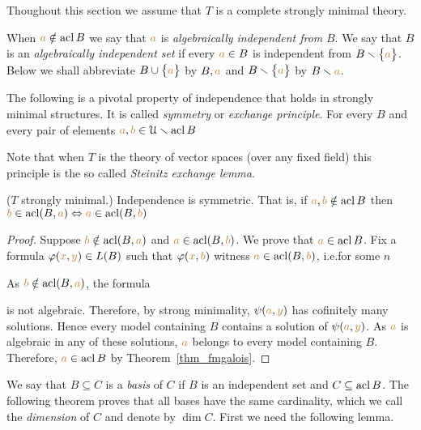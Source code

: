 Thoughout this section we assume that $T$ is a complete strongly minimal theory.
 

When ${\color{brown} a}\notin\mathop{\rm acl} B$ we say that ${\color{brown} a}$ is \emph{algebraically independent from\/} $B$.
We say that $B$ is an \emph{algebraically independent set\/} if every ${\color{brown} a}\in B$ is independent from $B\smallsetminus\big\{{\color{brown} a}\big\}$.
Below we shall abbreviate $B\cup\big\{{\color{brown} a}\big\}$ by \emph{$B,{\color{brown} a}$} and  $B\smallsetminus\big\{{\color{brown} a}\big\}$ by \emph{$B\smallsetminus{\color{brown}a}$}.


The following is a pivotal property of independence that holds in strongly minimal structures.
It is called \emph{symmetry\/} or \emph{exchange principle}.
For every $B$ and every pair of elements ${\color{brown} a},{\color{brown} b}\in\EuScript U\smallsetminus\mathop{\rm acl} B$


Note that when $T$ is the theory of vector spaces (over any fixed field) this principle is the so called \emph{Steinitz exchange lemma}.

\begin{theorem} 
($T$ strongly minimal.) Independence is symmetric.
That is, if ${\color{brown} a},{\color{brown} b}\notin\mathop{\rm acl} B$ then ${\color{brown} b}\in\mathop{\rm acl} (B,{\color{brown} a})\Leftrightarrow{\color{brown}a}\in\mathop{\rm acl}(B,{\color{brown} b})$
\end{theorem} 

\begin{proof} 
Suppose ${\color{brown} b}\notin\mathop{\rm acl}(B,{\color{brown} a})$ and ${\color{brown} a}\in\mathop{\rm acl}(B,{\color{brown} b})$.
We prove that ${\color{brown} a}\in\mathop{\rm acl} B$.
Fix a formula $\varphi({\color{brown} x},{\color{brown} y})\in L(B)$ such that $\varphi({\color{brown} x},{\color{brown} b})$ witness ${\color{brown} a}\in\mathop{\rm acl}(B,{\color{brown} b})$, i.e.\@ for some $n$


As ${\color{brown} b}\notin\mathop{\rm acl}(B,{\color{brown} a})$, the formula


is not algebraic.
Therefore, by strong minimality, $\psi({\color{brown} a},{\color{brown} y})$ has cofinitely many solutions.
Hence every model containing $B$ contains a solution of $\psi({\color{brown} a},{\color{brown} y})$.
As ${\color{brown} a}$ is algebraic in any of these solutions, ${\color{brown} a}$ belongs to every model containing $B$.
Therefore, ${\color{brown} a}\in\mathop{\rm acl} B$ by Theorem~\ref{thm_fmgalois}.
\end{proof}

We say that $B\subseteq C$ is a \emph{basis\/} of $C$ if $B$ is an independent set and $C\subseteq\mathop{\rm acl} B$.
The following theorem proves that all bases have the same cardinality, which we call the  \emph{dimension\/} of $C$ and denote by \emph{$\dim C$}.
First we need the following lemma.

